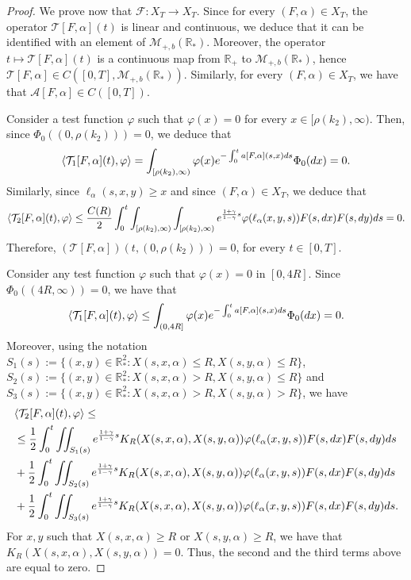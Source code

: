 \documentclass[11pt]{article}
\numberwithin{equation}{section}
\theoremstyle{plain}
\newcommand{\der}{\textup{d}}
\begin{document}
\begin{proof}
We prove now that $\mathcal F: X_T \rightarrow X_T$. 
Since for every $(F,\alpha) \in X_T$, the operator $\mathcal T[F,\alpha](t)$ is linear and continuous, we deduce that it can be identified with an element of $\mathcal M_{+, b} (\mathbb R_*) .$ Moreover, the operator $t \mapsto \mathcal T[F,\alpha](t)$ is a continuous map from $\mathbb R_{+}$ to $\mathcal M_{+, b} (\mathbb R_*)$, hence $\mathcal T [F,\alpha] \in C([0, T], \mathcal M_{+,b}(\mathbb R_*))$. 
Similarly, for every $(F,\alpha) \in X_T $, we have that $\mathcal A[F, \alpha ] \in C([0,T])$. 

Consider a test function $\varphi $ such that $\varphi(x)=0$ for every $ x \in [\rho(k_2), \infty)$. Then, since $\Phi_0((0,\rho(k_2)))=0$, we deduce that
\[
\langle \mathcal T_1[F,\alpha](t), \varphi \rangle= \int_{[\rho(k_2), \infty)}\varphi(x) e^{-\int_{0}^{t}a[F,\alpha](s,x)\der s} \Phi_0(\der x) =0. 
\] 
Similarly, since $\ell_\alpha(s,x,y) \geq x $ and since $(F,\alpha) \in X_T$, we deduce that
\begin{align*}
 \langle \mathcal T_2[F,\alpha](t), \varphi \rangle \leq \frac{C(R)}{2} \int_0^t \int_{[\rho(k_2), \infty)} \int_{[\rho(k_2), \infty)} e^{\frac{1+\gamma}{1-\gamma}s}\varphi(\ell_\alpha(x,y,s))F(s, \der x) F(s, \der y)\der s=0.
\end{align*}
Therefore, $(\mathcal T[F,\alpha])(t,(0,\rho(k_2)))=0$, for every $t \in [0, T].$

Consider any test function $\varphi$ such that $\varphi(x)=0$ in $[0,4R]$. Since $\Phi_0((4R, \infty))=0$, we have that
\[
\langle \mathcal T_1[F,\alpha](t), \varphi \rangle  \leq 
\int_{(0, 4 R]} \varphi(x)  e^{-\int_{0}^{t}a[F,\alpha](s,x)\der s}  \Phi_0(\der x)
=0.
\] 
Moreover, using the notation $S_1(s):=\{ (x,y) \in \mathbb R_*^2  : X(s,x,\alpha) \leq R, X(s,y,\alpha) \leq R  \} $,
$S_2(s):=\{ (x,y) \in \mathbb R_*^2  : X(s,x,\alpha) > R, X(s,y,\alpha) \leq R  \} $ and $S_3(s):=\{ (x,y) \in \mathbb R_*^2  : X(s,x,\alpha) > R, X(s,y,\alpha) > R  \} $, we have
\begin{align*}
 & \langle \mathcal  T_2[F,\alpha](t), \varphi \rangle \leq \\
 &\leq\frac{1}{2} \int_0^t  \iint_{S_1(s)} e^{\frac{1+\gamma}{1-\gamma}s}
  K_R(X(s,x,\alpha),X(s,y,\alpha))\varphi(\ell_\alpha(x,y,s))F(s, \der x) F(s,\der y)\der s\\
    &+ \frac{1}{2} \int_0^t  \iint_{S_2(s)} e^{\frac{1+\gamma}{1-\gamma}s}
  K_R(X(s,x,\alpha),X(s,y,\alpha))\varphi(\ell_\alpha(x,y,s))F(s, \der x) F(s,\der y)\der s \\ 
  &+ \frac{1}{2} \int_0^t \iint_{S_3(s)} e^{\frac{1+\gamma}{1-\gamma}s}
  K_R(X(s,x,\alpha),X(s,y,\alpha))\varphi(\ell_\alpha(x,y,s))F(s, \der x) F(s,\der y)\der s.
\end{align*}
For $x,y$ such that $X(s,x,\alpha) \geq R$ or $X(s,y,\alpha) \geq R$, we have that $K_R(X(s,x,\alpha),X(s,y,\alpha))=0$. Thus, the second and the third terms above are equal to zero.


\end{proof}
\end{document}
